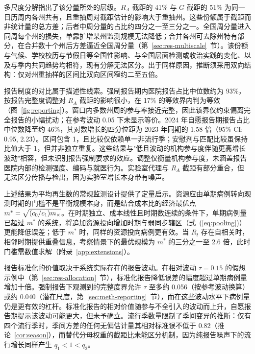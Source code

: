 多尺度分解指出了该分量所处的层级。$R_A$ 截距的 41\% 与 $G$ 截距的 51\% 为同一日历周内各州共有，且重抽周对截距估计的影响大于重抽州。这些份额属于截距而非统计量的总方差；后者中周分量的占比约四分之一至三分之一。全国周分量进入同周每个州的损失，单靠扩增某州监测规模无法降低；合并各州可去除州特有部分，在合并数十个州后方差逼近全国周分量（第~\ref{sec:res-multiscale}~节）。该份额与气候、学校校历与节假日等全国性影响\citep{cauchemez2008estimating, shaman2010absolute}、与全国层面检测或收治实践的变化、以及与季内共同趋势均相符，现有分解无法区分。出于同样原因，推断须采用双向结构：仅对州重抽样的区间比双向区间窄约二至五倍\citep{owen2007pigeonhole, cameron2011robust}。

报告制度的对比属于描述性线索。强制报告期内医院报告占比中位数约为 93\%，按报告完整度调整对 $R_A$ 截距的影响很小，在 17\% 的等效界内判为等效（图~\ref{fig:reporting}）。窗口内多数州周的参与率接近完整，因此该界仅约束偏离完全报告的小幅扰动；在参考波动 0.05 下未显示等价。2024 年自愿报告期报告占比中位数降至约 46\%，其对数增长的四分位距为 2023 年同期的 1.58 倍（95\% CI: 0.95, 2.23）。区间包含 1，且比较仅依赖单一非流行季；安慰剂与匹配比较虽保持比值大于 1，但并非独立重复。这些结果与"低且波动的机构参与度伴随更高增长波动"相容，但未识别报告强制要求的效应。调整仅衡量机构参与度，未涵盖报告医院内部的检测强度、编码与就医行为。实验室代理与 $R_A$ 截距有部分重合，但无法区分传播与检出，因为实验室增长本身带有噪声。

上述结果为平均再生数的常规监测设计提供了定量启示。资源应由单期病例转向观测时期的门槛不是平衡规模本身，而是结合成本比的经济最优点 $m^*=\sqrt{(c_0/c_1)m_{\times}}$。在时期独立、成本线性且时期数连续的条件下，单期病例量已超过 $m^*$ 的系统，将追加资源投向增加时期与弱同步辖区（式~(\ref{eq:pooling})）更能降低误差；低于 $m^*$ 时，同样的资源投向病例更有效。当 $R_t$ 存在自相关时，相邻时期提供重叠信息，考察情景下的最优规模为 $m^*$ 的三分之一至 2.6 倍，此时门槛需数值求解（附录~\ref{app:extensions}）。

报告标准化的价值取决于系统实际存在的报告波动。在相对波动 $\tau=0.15$ 的假想示例中（第~\ref{sec:res-allocation}~节），标准化报告降低误差的幅度超过单期病例量增加十倍。强制报告下观测到的完整度界允许 $\tau$ 至多约 0.056（按参考波动换算）或约 0.040（潜在尺度，第~\ref{sec:meth-reporting}~节），而在这些波动水平下病例量仍是更有效的杠杆。标准化报告的相对价值随参与不全引入的波动而上升，自愿报告期提示该波动可能更大，但未予确立。流行季数量限制了季间变异的推断：仅有四个流行季时，季间方差的任何无偏估计量其相对标准误不低于 0.82（推论~\ref{cor:season}），而替代分母权重的截距比未能区分机制，因为纯报告噪声下的流行增长同样产生 $q_1<1<q_2$。

